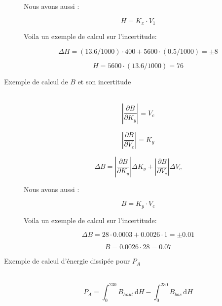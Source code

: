 \documentclass{article}
\begin{document}
\begin{description}
Nous avons aussi :

\begin{equation*}
H = K_x\cdot V_1
\end{equation*}

Voila un exemple de calcul sur l'incertitude:

\begin{equation*}
\Delta H = (13.6/1000)\cdot 400 + 5600\cdot (0.5/1000) = \pm 8
\end{equation*}

\begin{equation*}
H = 5600\cdot (13.6/1000) = 76 
\end{equation*}

\item[Exemple de calcul de $B$ et son incertitude]\hfill\\


\begin{equation*}
\left| \frac{\partial B}{\partial K_y} \right| = V_c
\end{equation*}

\begin{equation*}
\left| \frac{\partial B}{\partial V_c} \right| = K_y
\end{equation*}

\begin{equation*}
\Delta B =
\left| \frac{\partial B}{\partial K_y} \right|\Delta K_y +
\left| \frac{\partial B}{\partial V_c} \right|\Delta V_c
\end{equation*}

Nous avons aussi :

\begin{equation*}
B = K_y\cdot V_c
\end{equation*}

Voila un exemple de calcul sur l'incertitude:

\begin{equation*}
\Delta B = 28\cdot 0.0003 +0.0026\cdot 1 = \pm 0.01
\end{equation*}

\begin{equation*}
B = 0.0026\cdot 28 = 0.07 
\end{equation*}

\pagebreak


\item[Exemple de calcul d'énergie dissipée pour $P_A$]\hfill\\

\begin{equation*}
P_A = \int_0^{230}\! B_{haut}\,\mathrm{d}H - \int_0^{230}\! B_{bas}\,\mathrm{d}H
\end{equation*}


\end{description}
\end{document}
